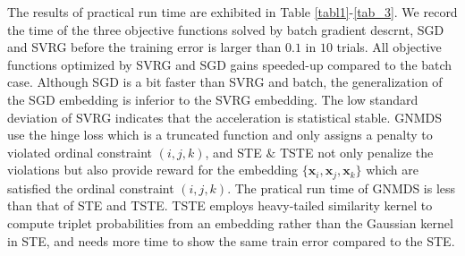 \documentclass[letterpaper]{article}
\begin{document}
		The results of practical run time are exhibited in Table \ref{tabl1}-\ref{tab_3}. We record the time of the three objective functions solved by batch gradient descrnt, SGD and SVRG before the training error is larger than $0.1$ in $10$ trials. All objective functions optimized by SVRG and SGD gains speeded-up compared to the batch case. Although SGD is a bit faster than SVRG and batch, the generalization of the SGD embedding is inferior to the SVRG embedding. The low standard deviation of SVRG indicates that the acceleration is statistical stable. GNMDS use the hinge loss which is a truncated function and only assigns a penalty to violated ordinal constraint $(i,j,k)$, and STE $\&$ TSTE not only penalize the violations but also provide reward for the embedding $\{\mathbf{x}_i, \mathbf{x}_j, \mathbf{x}_k\}$ which are satisfied the ordinal constraint $(i,j,k)$. The pratical run time of GNMDS is less than that of STE and TSTE. TSTE employs heavy-tailed similarity kernel to compute triplet probabilities from an embedding rather than the Gaussian kernel in STE, and needs more time to show the same train error compared to the STE.
		
\end{document}
